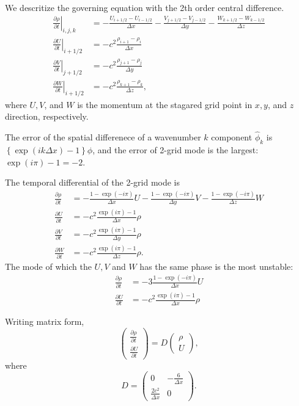 We descritize the governing equation with the 2th order central difference.
\begin{align}
  \left. \frac{\partial \rho}{\partial t}\right|_{i,j,k} &=
  -\frac{U_{i+1/2}-U_{i-1/2}}{\Delta x}
  -\frac{V_{j+1/2}-V_{j-1/2}}{\Delta y}
  -\frac{W_{k+1/2}-W_{k-1/2}}{\Delta z} \\
  \left. \frac{\partial U}{\partial t}\right|_{i+1/2} &=
  -c^2\frac{\rho_{i+1}-\rho_i}{\Delta x} \\
  \left. \frac{\partial V}{\partial t}\right|_{j+1/2} &=
  -c^2\frac{\rho_{j+1}-\rho_j}{\Delta y} \\
  \left. \frac{\partial W}{\partial t}\right|_{i+1/2} &=
  -c^2\frac{\rho_{k+1}-\rho_k}{\Delta z},
\end{align}
where $U, V$, and $W$ is the momentum at the stagared grid point in $x, y$, and $z$ direction, respectively.

The error of the spatial differenece of a wavenumber $k$ component $\hat{\phi}_k$ is $\left\{\exp(ik\Delta x)-1\right\}\hat{\phi}$, and the error of 2-grid mode is the largest: $\exp(i\pi)-1 = -2$.

The temporal differential of the 2-grid mode is
\begin{align}
  \frac{\partial \rho}{\partial t} &=
  -\frac{1-\exp(-i\pi)}{\Delta x}U
  -\frac{1-\exp(-i\pi)}{\Delta y}V
  -\frac{1-\exp(-i\pi)}{\Delta z}W \\
  \frac{\partial U}{\partial t} &=
  -c^2\frac{\exp(i\pi)-1}{\Delta x}\rho \\
  \frac{\partial V}{\partial t} &=
  -c^2\frac{\exp(i\pi)-1}{\Delta y}\rho \\
  \frac{\partial W}{\partial t} &=
  -c^2\frac{\exp(i\pi)-1}{\Delta z}\rho.
\end{align}
The mode of which the $U, V$ and $W$ has the same phase is the most unstable:
\begin{align}
  \frac{\partial \rho}{\partial t} &=
  -3\frac{1-\exp(-i\pi)}{\Delta x}U \\
  \frac{\partial U}{\partial t} &=
  -c^2\frac{\exp(i\pi)-1}{\Delta x}\rho
\end{align}

Writing matrix form,
\begin{equation}
  \begin{pmatrix}
    \frac{\partial \rho}{\partial t} \\
    \frac{\partial U}{\partial t}
  \end{pmatrix}
  = D
  \begin{pmatrix}
    \rho \\
    U
  \end{pmatrix},
\end{equation}
where
\begin{equation}
  D =
  \begin{pmatrix}
    0 & -\frac{6}{\Delta x} \\
    \frac{2c^2}{\Delta x} & 0
  \end{pmatrix}.
\end{equation}


